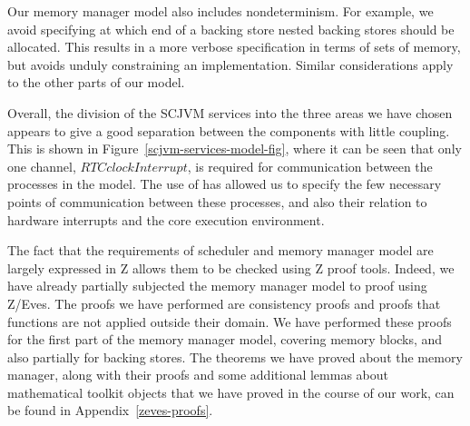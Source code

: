 {Our memory manager model also includes nondeterminism.
For example, we avoid specifying at which end of a backing store
nested backing stores should be allocated.
This results in a more verbose specification in terms of sets
of memory, but avoids unduly constraining an implementation.
Similar considerations apply to the other parts of our model.
}

Overall, the division of the SCJVM services into the three areas we
have chosen appears to give a good separation between the components
with little coupling.
This is shown in Figure~\ref{scjvm-services-model-fig}, where it can
be seen that only one channel, $RTCclockInterrupt$, is required for
communication between the processes in the model.
The use of \Circus{} has allowed us to specify the few necessary
points of communication between these processes, and also their
relation to hardware interrupts and the core execution environment.

The fact that the requirements of scheduler and memory manager model
are largely expressed in Z allows them to be checked using Z proof
tools.
Indeed, we have already partially subjected the memory manager model
to proof using Z/Eves.
The proofs we have performed are consistency proofs and proofs that
functions are not applied outside their domain.
We have performed these proofs for the first part of the memory
manager model, covering memory blocks, and also partially for backing
stores.
The theorems we have proved about the memory manager, along with their
proofs and some additional lemmas about mathematical toolkit objects
that we have proved in the course of our work, can be found in
Appendix~\ref{zeves-proofs}.


